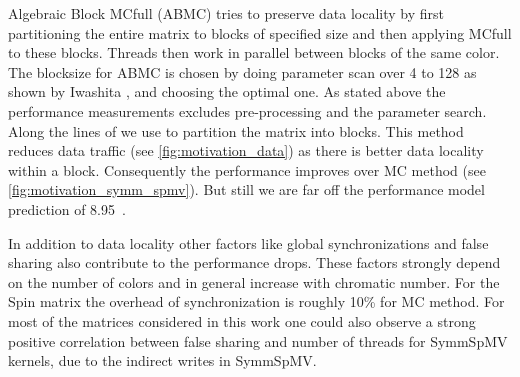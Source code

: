   
  Algebraic Block \acrshort{MC}full (\acrshort{ABMC}) tries to preserve data locality by first partitioning the entire matrix to blocks of specified size and then applying \acrshort{MC}full to these blocks. Threads then work in parallel between blocks of the same color. The blocksize for \acrshort{ABMC} is chosen by doing parameter scan over 4 to 128 as shown by Iwashita \etal \cite{ABMC}, and choosing the optimal one. As stated above the performance measurements excludes pre-processing and the parameter search. Along the lines of \cite{Park_HPCG} we use \METIS \cite{METIS} to partition the matrix into blocks.  This method reduces data traffic (see \cref{fig:motivation_data}) as there is better data locality within a block. Consequently the performance improves over \acrshort{MC} method (see \cref{fig:motivation_symm_spmv}). But still we are far off the performance model prediction of 8.95~\GF.
  
  In addition to data locality other factors like global synchronizations and false sharing also contribute to the performance drops. These factors strongly depend on the number of colors and in general increase with chromatic number. For the Spin matrix the overhead of synchronization is roughly 10\% for \acrshort{MC} method.  For most of the matrices considered in this work one could also observe a strong positive correlation between false sharing and number of threads for \acrshort{SymmSpMV} kernels, due to the indirect writes in \acrshort{SymmSpMV}.
 
 



